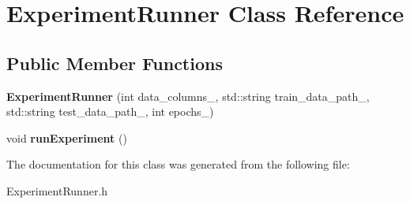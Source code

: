 \hypertarget{classExperimentRunner}{}\section{Experiment\+Runner Class Reference}
\label{classExperimentRunner}
\subsection*{Public Member Functions}
\begin{DoxyCompactItemize}
\item 
\mbox{\label{classExperimentRunner_aa222943315c762f38992d3d89c07171e}} 
{\bfseries Experiment\+Runner} (int data\+\_\+columns\+\_\+, std\+::string train\+\_\+data\+\_\+path\+\_\+, std\+::string test\+\_\+data\+\_\+path\+\_\+, int epochs\+\_\+)
\item 
\mbox{\label{classExperimentRunner_a9239a9a2b6e7bb8b69a2b0554c81e0c5}} 
void {\bfseries run\+Experiment} ()
\end{DoxyCompactItemize}


The documentation for this class was generated from the following file\+:\begin{DoxyCompactItemize}
\item 
Experiment\+Runner.\+h\end{DoxyCompactItemize}
